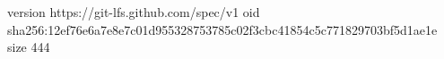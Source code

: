 version https://git-lfs.github.com/spec/v1
oid sha256:12ef76e6a7e8e7c01d955328753785c02f3cbc41854c5c771829703bf5d1ae1e
size 444
